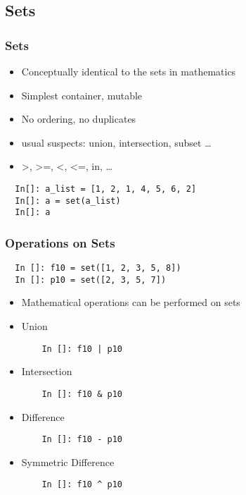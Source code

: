 \documentclass[14pt,compress]{beamer}
\begin{document}
\subsection{Sets}
\begin{frame}[fragile]
  \frametitle{Sets}
  \begin{itemize}
  \item Conceptually identical to the sets in mathematics
  \item Simplest container, mutable
  \item No ordering, no duplicates
  \item usual suspects: union, intersection, subset \ldots
  \item >, >=, <, <=, in, \ldots
  \end{itemize}
  \begin{lstlisting}
  In[]: a_list = [1, 2, 1, 4, 5, 6, 2]
  In[]: a = set(a_list)
  In[]: a
  \end{lstlisting}
\end{frame}

\begin{frame}
  \frametitle{Operations on Sets}
  \begin{lstlisting}
  In []: f10 = set([1, 2, 3, 5, 8])
  In []: p10 = set([2, 3, 5, 7])
  \end{lstlisting}
  \begin{itemize}
  \item Mathematical operations can be performed on sets
  \end{itemize}
  \begin{itemize}
  \item Union
    \begin{lstlisting}
    In []: f10 | p10
    \end{lstlisting}
  \item Intersection
    \begin{lstlisting}
    In []: f10 & p10
    \end{lstlisting}
  \item Difference
    \begin{lstlisting}
    In []: f10 - p10
    \end{lstlisting}
  \item Symmetric Difference
\begin{lstlisting}
    In []: f10 ^ p10
    \end{lstlisting}
  \end{itemize}
\end{frame}
\end{document}
